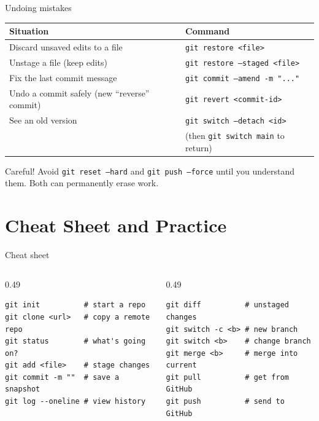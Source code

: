 \documentclass[aspectratio=169,11pt]{beamer}
\newcommand{\cmd}[1]{\texttt{\color{gitred}#1}}
\begin{document}
\begin{frame}{Undoing mistakes}
  \small
  \begin{tabular}{@{}p{}p{}@{}}
    \toprule
    \textbf{Situation} & \textbf{Command} \\
    \midrule
    Discard unsaved edits to a file & \cmd{git restore <file>} \\
    Unstage a file (keep edits) & \cmd{git restore --staged <file>} \\
    Fix the last commit message & \cmd{git commit --amend -m "..."} \\
    Undo a commit safely (new ``reverse'' commit) & \cmd{git revert <commit-id>} \\
    See an old version & \cmd{git switch --detach <id>} \\
                       & (then \cmd{git switch main} to return) \\
    \bottomrule
  \end{tabular}

  \vspace{1em}
  \begin{alertblock}{Careful!}
    Avoid \cmd{git reset --hard} and \cmd{git push --force} until you understand them.
    Both can permanently erase work.
  \end{alertblock}
\end{frame}

\section{Cheat Sheet and Practice}

\begin{frame}[fragile]{Cheat sheet}
  \begin{columns}[T]
    \begin{column}{0.49\textwidth}
\begin{lstlisting}
git init          # start a repo
git clone <url>   # copy a remote repo
git status        # what's going on?
git add <file>    # stage changes
git commit -m ""  # save a snapshot
git log --oneline # view history
\end{lstlisting}
    \end{column}
    \begin{column}{0.49\textwidth}
\begin{lstlisting}
git diff          # unstaged changes
git switch -c <b> # new branch
git switch <b>    # change branch
git merge <b>     # merge into current
git pull          # get from GitHub
git push          # send to GitHub
\end{lstlisting}
    \end{column}
  \end{columns}
\end{frame}
\end{document}
